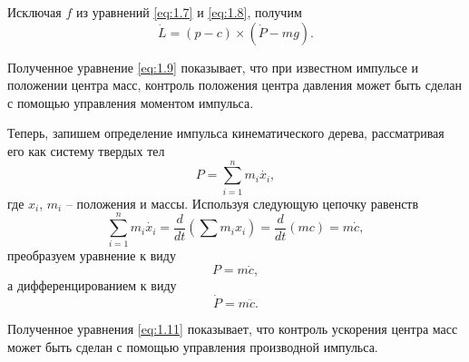 Исключая $f$ из уравнений \ref{eq:1.7} и \ref{eq:1.8}, получим
\begin{equation*}
\dot{L} = (p - c) \times (\dot{P} - mg). \tag{1.9}\label{eq:1.9}
\end{equation*}

Полученное уравнение \ref{eq:1.9} показывает, что при известном импульсе и положении центра масс, контроль положения центра давления может быть сделан с помощью управления моментом импульса.

Теперь, запишем определение импульса кинематического дерева, рассматривая его как систему твердых тел
\begin{equation*}
  P = \sum_{i = 1}^{n} m_{i} \dot{x_{i}},
\end{equation*}
где $x_{i}$, $m_{i}$ -- положения и массы. Используя следующую цепочку равенств
\begin{equation*}
  \sum_{i = 1}^{n} m_{i} \dot{x_{i}} = \frac{d}{dt} (\sum m_{i} x_{i}) = \frac{d}{dt} (mc) = m \dot{c},
\end{equation*}
преобразуем уравнение к виду
\begin{equation}
  P = m \dot{c}, \tag{1.10}\label{eq:1.10}
\end{equation}
а дифференцированием к виду
\begin{equation}
  \dot{P} = m \ddot{c}. \tag{1.11}\label{eq:1.11}
\end{equation}

Полученное уравнения \ref{eq:1.11} показывает, что контроль ускорения центра масс может быть сделан с помощью управления производной импульса.